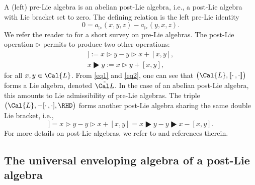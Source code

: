 \documentclass[pdftex]{sigma}
\numberwithin{equation}{section}
\begin{document}
A (left) pre-Lie algebra is an abelian post-Lie algebra, i.e., a post-Lie algebra with Lie bracket set to zero. The defining relation is the left pre-Lie identity
\begin{equation}
\label{left-pl}
0=a_\rhd(x,y,z)-a_\rhd(y,x,z).
\end{equation}
We refer the reader to \cite{AL2011} for a short survey on pre-Lie algebras. The post-Lie operation $\rhd$ permits to produce two other operations:
\begin{gather*}
[\![x, y]\!] := x \rhd y - y \rhd x + [x, y],
\\
x \RHD y := x \rhd y + [x, y],
\end{gather*}
for all $x, y \in \Cal{L}$. From \eqref{eq1} and \eqref{eq2}, one can see that $\big(\Cal{L}, [\![\cdot\,,\cdot ]\!]\big)$ forms a Lie algebra, denoted $\tilde{\Cal L}$. In the case of an abelian post-Lie algebra, this amounts to Lie admissibility of pre-Lie algebras. The triple $\big(\Cal{L}, - [\cdot\,,\cdot ], \RHD\big)$ forms another post-Lie algebra \cite{CEO20, HA13} sharing the same double Lie bracket, i.e.,
\begin{displaymath}
[\![x, y]\!]
= x \rhd y - y \rhd x + [x, y]
=x \RHD y - y \RHD x - [x, y].
\end{displaymath}
For more details on post-Lie algebras, we refer to \cite{CEMK18,ELM2015,EI2018,HA13} and references therein.

\subsection{The universal enveloping algebra of a post-Lie algebra}
\end{document}
